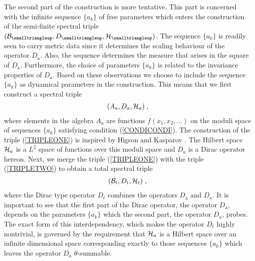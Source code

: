 \documentclass[12pt]{article}
\newcommand{\ba}{\begin{eqnarray}}
\newcommand{\ea}{\end{eqnarray}}
\def\cb{{\cal B}}
\def\ch{{\cal H}}
\begin{document}
The second part of the construction is more tentative. This part is concerned with the infinite sequence $\{a_k\}$ of free parameters which enters the construction of the semi-finite spectral triple $(\cb_{\smalltriangleup},D_{\smalltriangleup},\ch_\smalltriangleup)$. 
The sequence $\{a_k\}$ is readily seen to carry metric data since it determines the scaling behaviour of the operator $D_{\smalltriangleup}$. Also, the sequence determines the measure that arises in the square of $D_{\smalltriangleup}$. Furthermore, the choice of parameters $\{a_k\}$ is related to the invariance properties of $D_{\smalltriangleup}$. 
Based on these observations we choose to include the sequence $\{a_k\}$ as dynamical parameters in the construction. This means that we first construct a spectral triple
\ba 
(A_a,D_a,\ch_a)\;,
\label{TRIPLEONE}
\ea
where elements in the algebra $A_a$ are functions $f(x_1,x_2,\ldots)$ on the moduli space of sequences $\{a_k\}$ satisfying condition (\ref{CONDICONDI}). The construction of the triple (\ref{TRIPLEONE}) is inspired by Higson and Kasparov \cite{Higson}. The Hilbert space $\ch_a$ is a $L^2$ space of functions over this moduli space and $D_a$ is a Dirac operator hereon. Next, we merge the triple (\ref{TRIPLEONE}) with the triple (\ref{TRIPLETWO}) to obtain a total spectral triple
\ba 
(\cb_t,D_t,\ch_t)\;,
\label{thetriple}
\ea
where the Dirac type operator $D_t$ combines the operators
$D_{\smalltriangleup}$ and $D_a $.
It is important to see that the first part of the Dirac operator, the operator $D_{\smalltriangleup}$, depends on the parameters $\{a_k\}$ which the second part, the operator $D_a$, probes. The exact form of this interdependency, which makes the operator $D_t$ highly nontrivial, is governed by the requirement that $\ch_a$ is a Hilbert space over an infinite dimensional space corresponding exactly to those sequences $\{a_k\}$ which leaves the operator $D_{\smalltriangleup}$ $\theta$-summable. \\
\end{document}
